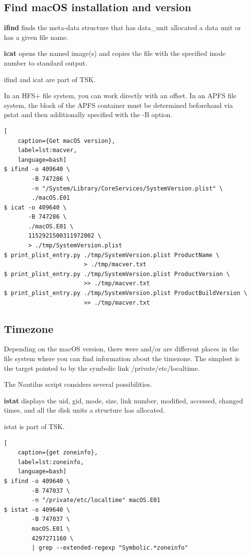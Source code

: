 \subsection{Find macOS installation and version}

\textbf{ifind}  finds  the meta-data structure that has data\_unit allocated a data unit or has a given file name.

\textbf{icat} opens the named image(s) and copies the file with the specified inode number to standard output.

ifind and icat are part of TSK.

In an HFS+ file system, you can work directly with an offset. In an APFS file system, the block of the APFS container must be determined beforehand via pstat and then additionally specified with the -B option.

\begin{lstlisting}[
    caption={Get macOS version},
    label=lst:macver,
    language=bash]
$ ifind -o 409640 \
        -B 747286 \
        -n "/System/Library/CoreServices/SystemVersion.plist" \
        ./macOS.E01
$ icat -o 409640 \
       -B 747286 \
       ./macOS.E01 \
       1152921500311972002 \
       > ./tmp/SystemVersion.plist
$ print_plist_entry.py ./tmp/SystemVersion.plist ProductName \
                       > ./tmp/macver.txt
$ print_plist_entry.py ./tmp/SystemVersion.plist ProductVersion \
                       >> ./tmp/macver.txt
$ print_plist_entry.py ./tmp/SystemVersion.plist ProductBuildVersion \
                       >> ./tmp/macver.txt
\end{lstlisting}

\subsection{Timezone}

Depending on the macOS version, there were and/or are different places in the file system where you can find information about the timezone. The simplest is the target pointed to by the symbolic link /private/etc/localtime.

The Nautilus script considers several possibilities.

\textbf{istat} displays the uid, gid, mode, size, link number, modified, accessed, changed times, and all the disk units a structure has allocated.

istat is part of TSK.

\begin{lstlisting}[
    caption={get zoneinfo},
    label=lst:zoneinfo,
    language=bash]
$ ifind -o 409640 \
        -B 747037 \
        -n "/private/etc/localtime" macOS.E01
$ istat -o 409640 \
        -B 747037 \
        macOS.E01 \
        4297271160 \
        | grep --extended-regexp "Symbolic.*zoneinfo"
\end{lstlisting}

